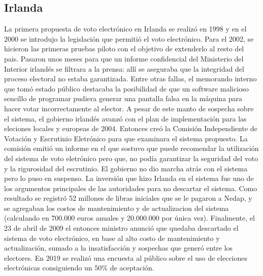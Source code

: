 \subsection{Irlanda}
La primera propuesta de voto electrónico en Irlanda se realizó en 1998 y en el 2000 se introdujo la legislación que permitió el voto electrónico. Para el 2002, se hicieron las primeras pruebas piloto con el objetivo de extenderlo al resto del pais. Pasaron unos meses para que un informe confidencial del Ministerio del Interior irlandés se filtrara a la prensa: allí se aseguraba que la integridad del proceso electoral no estaba garantizada. Entre otras fallas, el memorando interno que tomó estado público destacaba la posibilidad de que un software malicioso sencillo de programar pudiera generar una pantalla falsa en la máquina para hacer votar incorrectamente al elector. A pesar de este manto de sospecha sobre el sistema, el gobierno irlandés avanzó con el plan de implementación para las eleciones locales y europeas de 2004. Entonces creó la Comisión Independiente de Votación y Escrutinio Eletrónico para que examinara el sistema propuesto. La comisión emitió un informe en el que sostuvo que puede recomendar la utilización del sistema de voto eletrónico pero que, no podía garantizar la seguridad del voto y la rigurosidad del escrutinio. El gobierno no dio marcha atrás con el sistema pero lo puso en suspenso. La inversión que hizo Irlanda en el sistema fue uno de los argumentos principales de las autoridades para no descartar el sistema. Como resultado se registró 52 millones de libras iniciales que se le pagaron a Nedap, y se agregaban los costos de mantenimiento y de actualizacion del sistema (calculando en 700.000 euros anuales y 20.000.000 por única vez).\newline
Finalmente, el 23 de abril de 2009 el entonces ministro anunció que quedaba descartado el sistema de voto electrónico, en base al alto costo de mantenimiento y actualización, sumado a la insatisfacción y sospechas que generó entre los electores. En 2019 se realizó una encuesta al público sobre el uso de elecciones electrónicas consiguiendo un 50\% de aceptación. \cite{eleccionesIrlanda}
